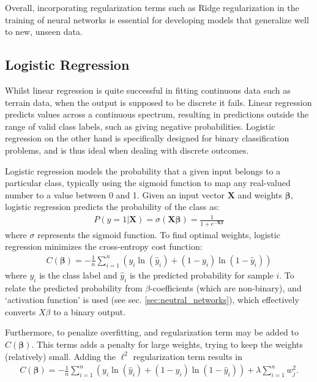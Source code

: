 \documentclass[%
reprint,s
amsmath,amssymb,
aps,
]{revtex4-2}
\begin{document}
Overall, incorporating regularization terms such as Ridge regularization in the training of neural networks is essential for developing models that generalize well to new, unseen data. 


\subsection{Logistic Regression}
Whilst linear regression is quite successful in fitting continuous data such as terrain data, when the output is supposed to be discrete it fails. Linear regression predicts values across a continuous spectrum, resulting in predictions outside the range of valid class labels, such as giving negative probabilities. Logistic regression on the other hand is specifically designed for binary classification problems, and is thus ideal when dealing with discrete outcomes. 

Logistic regression models the probability that a given input belongs to a particular class, typically using the sigmoid function to map any real-valued number to a value between 0 and 1. Given an input vector $\bm X$ and weights $\bm\beta$, logistic regression predicts the probability of the class as:
\begin{align}
	P(y=1|\bm X)=\sigma(\bm X\bm\beta)=\frac{1}{1+e^{-\bm X\bm\beta}}
\end{align}
where $\sigma$ represents the sigmoid function. To find optimal weights, logistic regression minimizes the cross-entropy cost function:
\begin{align}
	C(\bm\beta)=-\frac1n\sum_{i=1}^n\left(y_i \ln(\hat y_i)+(1-y_i)\ln(1-\hat y_i) \right)
\end{align}
where $y_i$ is the class label and $\hat{y}_i$ is the predicted probability for sample $i$. To relate the predicted probability from \(\beta\)-coefficients (which are non-binary), and `activation function' is used (see sec. \ref{sec:neutral_networks}), which effectively converts \(X\beta\) to a binary output. 

Furthermore, to penalize overfitting, and regularization term may be added to \(C(\bm\beta)\). This terms adds a penalty for large weights, trying to keep the weights (relatively) small. Adding the \(\ell^2\) regularization term results in 
\begin{align}
	C(\bm\beta)=-\frac1n\sum_{i=1}^n\left(y_i \ln(\hat y_i)+(1-y_i)\ln(1-\hat y_i) \right) + \lambda\sum\limits_{i=1}^{n}w_{j}^{2}.
\end{align}
\end{document}
